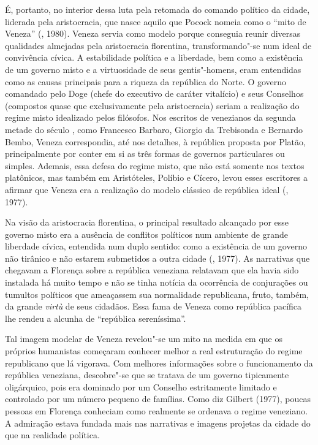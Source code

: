 É, portanto, no interior dessa luta pela retomada do comando político da
cidade, liderada pela aristocracia, que nasce aquilo que Pocock nomeia
como o ``mito de Veneza'' (, 1980). Veneza servia como modelo
porque conseguia reunir diversas qualidades almejadas pela aristocracia
florentina, transformando"-se num ideal de convivência cívica. A
estabilidade política e a liberdade, bem como a existência de um governo
misto e a virtuosidade de seus gentis"-homens, eram entendidas como as
causas principais para a riqueza da república do Norte. O governo
comandado pelo Doge (chefe do executivo de caráter vitalício) e seus
Conselhos (compostos quase que exclusivamente pela aristocracia) seriam
a realização do regime misto idealizado pelos filósofos. Nos escritos de
venezianos da segunda metade do século , como Francesco Barbaro,
Giorgio da Trebisonda e Bernardo Bembo, Veneza correspondia, até nos
detalhes, à república proposta por Platão, principalmente por conter em
si as três formas de governos particulares ou simples. Ademais, essa
defesa do regime misto, que não está somente nos textos platônicos, mas
também em Aristóteles, Políbio e Cícero, levou esses escritores a
afirmar que Veneza era a realização do modelo clássico de república
ideal (, 1977).

Na visão da aristocracia florentina, o principal resultado alcançado por
esse governo misto era a ausência de conflitos políticos num ambiente de
grande liberdade cívica, entendida num duplo sentido: como a existência
de um governo não tirânico e não estarem submetidos a outra cidade
(, 1977). As narrativas que chegavam a Florença sobre a república
veneziana relatavam que ela havia sido instalada há muito tempo e não se
tinha notícia da ocorrência de conjurações ou tumultos políticos que
ameaçassem sua normalidade republicana, fruto, também, da grande
\emph{virtù} de seus cidadãos. Essa fama de Veneza como república
pacífica lhe rendeu a alcunha de ``república sereníssima''.

Tal imagem modelar de Veneza revelou"-se um mito na medida em que os
próprios humanistas começaram conhecer melhor a real estruturação do
regime republicano que lá vigorava. Com melhores informações sobre o
funcionamento da república veneziana, descobre"-se que se tratava de um
governo tipicamente oligárquico, pois era dominado por um Conselho
estritamente limitado e controlado por um número pequeno de famílias.
Como diz Gilbert (1977), poucas pessoas em Florença conheciam como
realmente se ordenava o regime veneziano. A admiração estava fundada
mais nas narrativas e imagens projetas da cidade do que na realidade
política.

